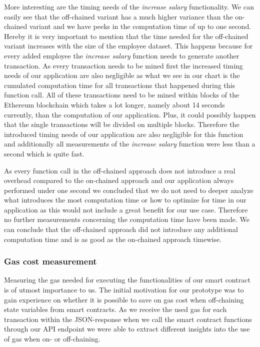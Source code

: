 More interesting are the timing needs of the \textit{increase salary} functionality.
We can easily see that the off-chained variant has a much higher variance than the on-chained variant and we have peeks in the computation time of up to one second.
Hereby it is very important to mention that the time needed for the off-chained variant increases with the size of the employee dataset.
This happens because for every added employee the \textit{increase salary} function needs to generate another transaction.
As every transaction needs to be mined first the increased timing needs of our application are also negligible as what we see in our chart is the cumulated computation time for all transactions that happened during this function call.
All of these transactions need to be mined within blocks of the Ethereum blockchain which takes a lot longer, namely about 14 seconds currently, than the computation of our application.
Plus, it could possibly happen that the single transactions will be divided on multiple blocks.
Therefore the introduced timing needs of our application are also negligible for this function and additionally all measurements of the \textit{increase salary} function were less than a second which is quite fast.%

As every function call in the off-chained approach does not introduce a real overhead compared to the on-chained approach and our application always performed under one second we concluded that we do not need to deeper analyze what introduces the most computation time or how to optimize for time in our application as this would not include a great benefit for our use case.
Therefore no further measurements concerning the computation time have been made.
We can conclude that the off-chained approach did not introduce any additional computation time and is as good as the on-chained approach timewise.

\subsubsection{Gas cost measurement}
Measuring the gas needed for executing the functionalities of our smart contract is of utmost importance to us.
The initial motivation for our prototype was to gain experience on whether it is possible to save on gas cost when off-chaining state variables from smart contracts.
As we receive the used gas for each transaction within the JSON-response when we call the smart contract functions through our API endpoint we were able to extract different insights into the use of gas when on- or off-chaining.

